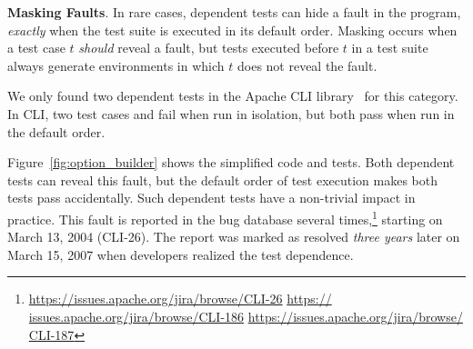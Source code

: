 

\vspace{1mm}

\noindent \textbf{Masking Faults}. In rare cases,
dependent tests can hide a fault in the
program, \emph{exactly} when the test suite is executed in its default
order. Masking occurs when a test case $t$ \emph{should}
reveal a fault, but tests executed before $t$ in a test suite always
generate environments in which $t$ does not reveal the fault.



We only found two dependent tests in
the Apache CLI library~\cite{cli} for this category.
In CLI, two test cases 
 and 
fail when run in isolation,
but both pass when run in the default order.

Figure~\ref{fig:option_builder} shows the simplified code and
tests. Both dependent tests can reveal this fault,  but
the default order of test execution makes both tests pass
accidentally. Such dependent tests
have a non-trivial impact in practice.
This fault is reported in the bug
database several times,\footnote{\url{https://issues.apache.org/jira/browse/CLI-26} \url{https://
issues.apache.org/jira/browse/CLI-186} \url{https://issues.apache.org/jira/browse/
CLI-187}} starting on March 13, 2004 (CLI-26). The report was marked as resolved
\emph{three years} later on March 15, 2007 when developers
realized the test dependence.





